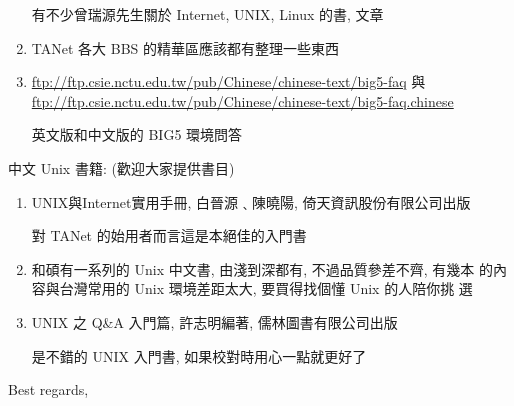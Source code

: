 \documentclass{letter}
\begin{document}
\begin{CJK*}{Bg5}{ming}
\begin{enumerate}
	有不少曾瑞源先生關於 Internet, UNIX, Linux 的書, 文章

\item TANet 各大 BBS 的精華區應該都有整理一些東西

\item \url{ftp://ftp.csie.nctu.edu.tw/pub/Chinese/chinese-text/big5-faq} 與
   \url{ftp://ftp.csie.nctu.edu.tw/pub/Chinese/chinese-text/big5-faq.chinese}

   英文版和中文版的 BIG5 環境問答

\end{enumerate}

中文 Unix 書籍:
(歡迎大家提供書目)
\begin{enumerate}
\item UNIX與Internet實用手冊, 白晉源﹑陳曉陽, 倚天資訊股份有限公司出版

	對 TANet 的始用者而言這是本絕佳的入門書
    
\item 和碩有一系列的 Unix 中文書, 由淺到深都有, 不過品質參差不齊, 有幾本
   的內容與台灣常用的 Unix 環境差距太大, 要買得找個懂 Unix 的人陪你挑
   選

\item UNIX 之 Q\&A 入門篇, 許志明編著, 儒林圖書有限公司出版 
        
       是不錯的 UNIX 入門書, 如果校對時用心一點就更好了

\end{enumerate}
\end{CJK*}
\closing{Best regards,}
\end{document}
